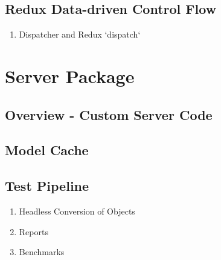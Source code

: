 \documentclass[../ClassicThesis.tex]{subfiles}
\begin{document}
\subsection{Redux Data-driven Control Flow}


\begin{enumerate}
\item Dispatcher and Redux `dispatch`

\end{enumerate}

\section{Server Package}


\subsection{Overview - Custom Server Code}


\subsection{Model Cache}


\subsection{Test Pipeline}


\begin{enumerate}
\item Headless Conversion of Objects


\item Reports


\item Benchmarks

\end{enumerate}
\end{document}
